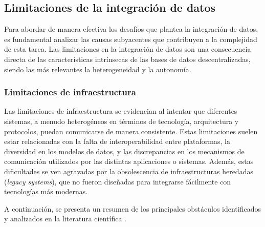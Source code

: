 \subsection{Limitaciones de la integración de datos}\label{section:data-integration-limitations}

    Para abordar de manera efectiva los desafíos que plantea la integración de datos, 
    es fundamental analizar las causas subyacentes que contribuyen a la complejidad de esta tarea. 
    Las limitaciones en la integración de datos son una consecuencia directa de las características 
    intrínsecas de las bases de datos descentralizadas, siendo las más relevantes la heterogeneidad y la autonomía.

    \subsubsection{Limitaciones de infraestructura}

        Las limitaciones de infraestructura se evidencian al intentar que diferentes sistemas, a menudo heterogéneos en términos de tecnología, arquitectura y protocolos, puedan comunicarse de manera consistente. 
        Estas limitaciones suelen estar relacionadas con la falta de interoperabilidad entre plataformas, la diversidad en los modelos de datos, y las discrepancias en los mecanismos de comunicación utilizados por las distintas aplicaciones o sistemas.
        Además, estas dificultades se ven agravadas por la obsolescencia de infraestructuras heredadas (\textit{legacy systems}), 
        que no fueron diseñadas para integrarse fácilmente con tecnologías más modernas. 
    
        A continuación, se presenta un resumen de los principales obstáculos identificados y analizados en la literatura científica \cite{mcleod1980federated, reddy1994methodology, doan2012principles}.

